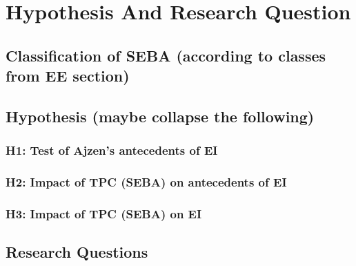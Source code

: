 \section{Hypothesis And Research Question}

\subsection{Classification of SEBA (according to classes from EE section)}

\subsection{Hypothesis (maybe collapse the following)}

\subsubsection{H1: Test of Ajzen's antecedents of EI}

\subsubsection{H2: Impact of TPC (SEBA) on antecedents of EI}

\subsubsection{H3: Impact of TPC (SEBA) on EI}

\subsection{Research Questions}